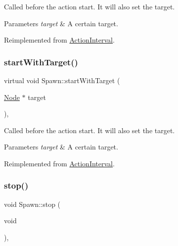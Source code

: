Called before the action start. It will also set the target.


\begin{DoxyParams}{Parameters}
{\em target} & A certain target. \\
\hline
\end{DoxyParams}


Reimplemented from \hyperlink{classActionInterval_ad3d91186b2c3108488ddbbdbbd982484}{Action\+Interval}.

\mbox{\label{classSpawn_a183fd0e3f0c44e3526e7196c32b3c80e}} 
\subsubsection{\texorpdfstring{start\+With\+Target()}{startWithTarget()}\hspace{0.1cm}{\footnotesize\ttfamily [2/2]}}
{\footnotesize\ttfamily virtual void Spawn\+::start\+With\+Target (\begin{DoxyParamCaption}\item[{\hyperlink{classNode}{Node} $\ast$}]{target }\end{DoxyParamCaption})\hspace{0.3cm}{\ttfamily [override]}, {\ttfamily [virtual]}}

Called before the action start. It will also set the target.


\begin{DoxyParams}{Parameters}
{\em target} & A certain target. \\
\hline
\end{DoxyParams}


Reimplemented from \hyperlink{classActionInterval_ad3d91186b2c3108488ddbbdbbd982484}{Action\+Interval}.

\mbox{\label{classSpawn_ab743d2f0b325be11b8939162d9d8984c}} 
\subsubsection{\texorpdfstring{stop()}{stop()}\hspace{0.1cm}{\footnotesize\ttfamily [1/2]}}
{\footnotesize\ttfamily void Spawn\+::stop (\begin{DoxyParamCaption}\item[{void}]{ }\end{DoxyParamCaption})\hspace{0.3cm}{\ttfamily [override]}, {\ttfamily [virtual]}}

